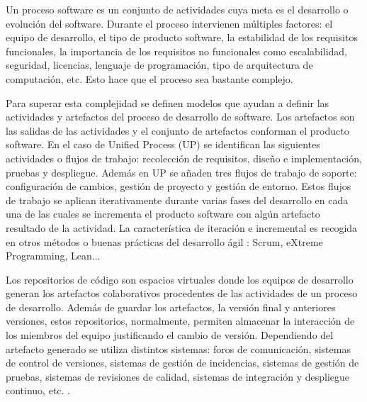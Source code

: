 

Un proceso software es un conjunto de actividades cuya meta es el desarrollo o evolución del software. Durante el proceso intervienen múltiples factores: el equipo de desarrollo, el tipo de producto software, la estabilidad de los requisitos funcionales, la importancia de los requisitos no funcionales como escalabilidad, seguridad, licencias, lenguaje de programación, tipo de arquitectura de computación, etc. Esto hace que el proceso sea bastante complejo.

Para superar esta complejidad se definen modelos que ayudan a definir las actividades y artefactos del proceso de desarrollo de software. Los artefactos son las salidas de las actividades y el conjunto de artefactos conforman el producto software. En el caso de  Unified Process (UP) \cite{jacobson_proceso_2000} se identifican las siguientes actividades o flujos de trabajo: recolección de requisitos, diseño e implementación, pruebas y despliegue. Además en UP se añaden tres flujos de trabajo de soporte: configuración de cambios, gestión de proyecto y gestión de entorno. Estos flujos de trabajo se aplican iterativamente durante varias fases del desarrollo en cada una de las cuales se incrementa el producto software con algún artefacto resultado de la actividad. La característica de iteración e incremental es recogida en otros métodos o buenas prácticas del desarrollo ágil \cite{noauthor_scrum_2019}: Scrum, eXtreme Programming, Lean...


Los repositorios de código son espacios virtuales donde los equipos de desarrollo generan los artefactos colaborativos procedentes de las actividades de un proceso de desarrollo. Además de guardar los artefactos, la versión final y anteriores versiones, estos repositorios, normalmente, permiten almacenar la interacción de los miembros del equipo justificando el cambio de versión. Dependiendo del artefacto generado se utiliza distintos sistemas: foros de comunicación, sistemas de control de versiones, sistemas de gestión de incidencias, sistemas de gestión de pruebas, sistemas de revisiones de calidad, sistemas de integración y despliegue continuo, etc. \cite{guemes-pena_emerging_2018}.

